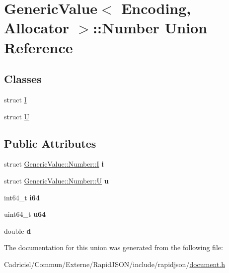 \hypertarget{union_generic_value_1_1_number}{}\section{Generic\+Value$<$ Encoding, Allocator $>$\+:\+:Number Union Reference}
\label{union_generic_value_1_1_number}
\subsection*{Classes}
\begin{DoxyCompactItemize}
\item 
struct \hyperlink{struct_generic_value_1_1_number_1_1_i}{I}
\item 
struct \hyperlink{struct_generic_value_1_1_number_1_1_u}{U}
\end{DoxyCompactItemize}
\subsection*{Public Attributes}
\begin{DoxyCompactItemize}
\item 
struct \hyperlink{struct_generic_value_1_1_number_1_1_i}{Generic\+Value\+::\+Number\+::I} {\bfseries i}\hypertarget{union_generic_value_1_1_number_a0593fffc72a240979606668179e94436}{}\label{union_generic_value_1_1_number_a0593fffc72a240979606668179e94436}

\item 
struct \hyperlink{struct_generic_value_1_1_number_1_1_u}{Generic\+Value\+::\+Number\+::U} {\bfseries u}\hypertarget{union_generic_value_1_1_number_a3b5f0986718c830b88d641491248131d}{}\label{union_generic_value_1_1_number_a3b5f0986718c830b88d641491248131d}

\item 
int64\+\_\+t {\bfseries i64}\hypertarget{union_generic_value_1_1_number_ae53d96a8ead92099541da3b71633b77b}{}\label{union_generic_value_1_1_number_ae53d96a8ead92099541da3b71633b77b}

\item 
uint64\+\_\+t {\bfseries u64}\hypertarget{union_generic_value_1_1_number_a1c8d3c6d226cf74315e233b30b622430}{}\label{union_generic_value_1_1_number_a1c8d3c6d226cf74315e233b30b622430}

\item 
double {\bfseries d}\hypertarget{union_generic_value_1_1_number_a7ca3ad492fff303586d241eb0d17c242}{}\label{union_generic_value_1_1_number_a7ca3ad492fff303586d241eb0d17c242}

\end{DoxyCompactItemize}


The documentation for this union was generated from the following file\+:\begin{DoxyCompactItemize}
\item 
Cadriciel/\+Commun/\+Externe/\+Rapid\+J\+S\+O\+N/include/rapidjson/\hyperlink{document_8h}{document.\+h}\end{DoxyCompactItemize}

